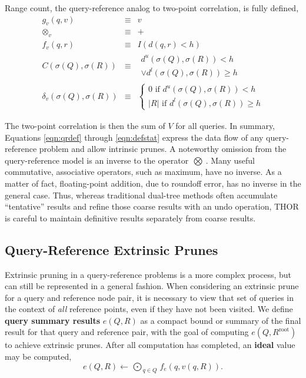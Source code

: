 \documentclass[twoside,leqno,twocolumn]{article}
\newcommand{\summary}{\delta}
\newcommand{\defterm}[1]{{\bf #1}}
\newcommand{\kdroot}[1]{#1^{\text{root}}}
\newcommand{\lo}[1]{#1^{l}}
\newcommand{\up}[1]{#1^{u}}
\newcommand{\distlo}{\lo{d}}
\newcommand{\distup}{\up{d}}
\newcommand{\dist}[2]{d(#1,#2)}
\newcommand{\nameOp}[2]{\mathop{#1\nolimits\!\!_{#2}}}
\newcommand{\nameop}[2]{#1_{\!#2}}
\newcommand{\myOp}[1]{\nameOp{\bigotimes}{#1}}
\newcommand{\myop}[1]{\nameop{\otimes}{#1}}
\newcommand{\letterqr}{v}
\newcommand{\outqr}{V}
\newcommand{\inqr}{v}
\newcommand{\Opqr}{\myOp{\letterqr}}
\newcommand{\opqr}{\myop{\letterqr}}
\newcommand{\fqr}{f_{\letterqr}}
\newcommand{\gqr}{g_{\letterqr}}
\newcommand{\letterqrv}{v}
\newcommand{\deltaqrv}{\summary_{\letterqrv}}
\newcommand{\canpruneqrv}{C}%
\newcommand{\lettermu}{e}
\newcommand{\inmu}{e}
\newcommand{\Outopmu}{\nameOp{\bigodot}{\lettermu}}%
\newcommand{\fmu}{f_{\lettermu}}
\newcommand{\outstat}{\sigma}
\begin{document}
\noindent
Range count, the query-reference analog to two-point correlation, is fully defined,
\begin{eqnarray*}
\gqr(q, \inqr) &\equiv& \inqr
\\
\opqr &\equiv& +
\\
\fqr(q,r) &\equiv& I(\dist{q}{r} < h)
\\
\canpruneqrv(\outstat(Q), \outstat(R))
&\equiv&
\begin{array}{l}\distup(\outstat(Q),\outstat(R)) < h \\ \vee \distlo(\outstat(Q),\outstat(R)) \geq h\end{array}
\\
\deltaqrv(\outstat(Q),\outstat(R)) &\equiv& \left\{ \begin{array}{l} 0 \text{ if } \distup(\outstat(Q),\outstat(R)) < h \\ |R| \text{ if } \distlo(\outstat(Q),\outstat(R)) \geq h \end{array}\right.
\end{eqnarray*}

\noindent
The two-point correlation is then the sum of $\outqr$ for all queries.
In summary, Equations \ref{eqn:qrdef} through \ref{eqn:defstat} express the data flow of any query-reference problem and allow intrinsic prunes.
A noteworthy omission from the query-reference model is an inverse to the operator $\Opqr$.
Many useful commutative, associative operators, such as maximum, have no inverse.
As a matter of fact, floating-point addition, due to roundoff error, has no inverse in the general case.
Thus, whereas traditional dual-tree methods often accumulate ``tentative'' results and refine those coarse results with an undo operation, THOR is careful to maintain definitive results separately from coarse results.

\subsection{Query-Reference Extrinsic Prunes}

Extrinsic pruning in a query-reference problems is a more complex process, but can still be represented in a general fashion.
When considering an extrinsic prune for a query and reference node pair, it is necessary to view that set of queries in the context of {\em all} reference points, even if they have not been visited.
We define \defterm{query summary results} $\inmu(Q, R)$ as a compact bound or summary of the final result for that query and reference pair, with the goal of computing $\inmu(Q, \kdroot{R})$ to achieve extrinsic prunes.
After all computation has completed, an \defterm{ideal} value may be computed,
\begin{equation*}
\inmu(Q, R) \gets \Outopmu_{q \in Q} \fmu(q, \inqr(q, R)).
\end{equation*}
\end{document}
